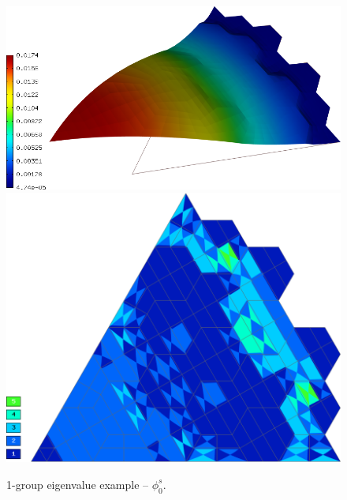 \begin{figure}[!ht]
\centering
  \includegraphics[scale=.25]{hex/f0.png}
	\hspace{.5em}
  \includegraphics[scale=.19]{hex/mesh_f0.png}
	\caption[Solution of the 1-group eigenvalue example]{1-group eigenvalue example -- $\phi_0^s$.}
	\label{fig:51}
\end{figure}
